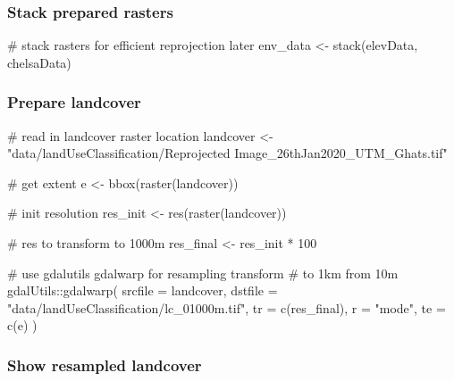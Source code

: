 \documentclass[]{article}
\newenvironment{Shaded}{}{}
\newcommand{\CommentTok}[1]{\textcolor[rgb]{0.00,0.50,0.00}{#1}}
\newcommand{\DataTypeTok}[1]{#1}
\newcommand{\DecValTok}[1]{#1}
\newcommand{\KeywordTok}[1]{\textcolor[rgb]{0.00,0.00,1.00}{#1}}
\newcommand{\NormalTok}[1]{#1}
\newcommand{\OperatorTok}[1]{#1}
\newcommand{\StringTok}[1]{\textcolor[rgb]{0.00,0.50,0.50}{#1}}
\begin{document}
\hypertarget{stack-prepared-rasters}{%
\subsubsection{Stack prepared rasters}\label{stack-prepared-rasters}}

\begin{Shaded}
\begin{Highlighting}[]
\CommentTok{# stack rasters for efficient reprojection later}
\NormalTok{env_data <-}\StringTok{ }\KeywordTok{stack}\NormalTok{(elevData, chelsaData)}
\end{Highlighting}
\end{Shaded}

\hypertarget{prepare-landcover}{%
\subsubsection{Prepare landcover}\label{prepare-landcover}}

\begin{Shaded}
\begin{Highlighting}[]
\CommentTok{# read in landcover raster location}
\NormalTok{landcover <-}\StringTok{ "data/landUseClassification/Reprojected Image_26thJan2020_UTM_Ghats.tif"}

\CommentTok{# get extent}
\NormalTok{e <-}\StringTok{ }\KeywordTok{bbox}\NormalTok{(}\KeywordTok{raster}\NormalTok{(landcover))}

\CommentTok{# init resolution}
\NormalTok{res_init <-}\StringTok{ }\KeywordTok{res}\NormalTok{(}\KeywordTok{raster}\NormalTok{(landcover))}

\CommentTok{# res to transform to 1000m}
\NormalTok{res_final <-}\StringTok{ }\NormalTok{res_init }\OperatorTok{*}\StringTok{ }\DecValTok{100}

\CommentTok{# use gdalutils gdalwarp for resampling transform}
\CommentTok{# to 1km from 10m}
\NormalTok{gdalUtils}\OperatorTok{::}\KeywordTok{gdalwarp}\NormalTok{(}
  \DataTypeTok{srcfile =}\NormalTok{ landcover,}
  \DataTypeTok{dstfile =} \StringTok{"data/landUseClassification/lc_01000m.tif"}\NormalTok{,}
  \DataTypeTok{tr =} \KeywordTok{c}\NormalTok{(res_final), }\DataTypeTok{r =} \StringTok{"mode"}\NormalTok{, }\DataTypeTok{te =} \KeywordTok{c}\NormalTok{(e)}
\NormalTok{)}
\end{Highlighting}
\end{Shaded}

\hypertarget{show-resampled-landcover}{%
\subsubsection{Show resampled landcover}\label{show-resampled-landcover}}
\end{document}
